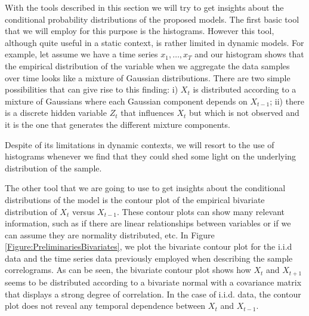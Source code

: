 With the tools described in this section we will try to get insights about the conditional probability distributions of the proposed models. The first basic tool that we will employ for this purpose is the histograms. However this tool, although quite useful in a static context, is rather limited in dynamic models. For example, let assume we have a time series $x_1,\ldots, x_T$ and our histogram shows that the empirical distribution of the variable when we aggregate the data samples over time looks like a mixture of Gaussian distributions. 
There are two simple possibilities that can give rise to this finding: 
i) $X_t$ is distributed according to a mixture of Gaussians where each Gaussian component depends on $X_{t-1}$; ii) there is a discrete hidden variable $Z_t$ that influences $X_{t}$ but which is not observed and it is the one that generates the different mixture components. 

Despite of its limitations in dynamic contexts, we will resort to the use of histograms whenever we find that they could shed some light on the underlying distribution of the sample.

The other tool that we are going to use to get insights about the conditional distributions of the model is the contour plot of the empirical bivariate distribution of $X_t$ versus $X_{t-1}$. These contour plots can show many relevant information, such as if there are linear relationships between variables or if we can assume they are normality distributed, etc. In Figure \ref{Figure:PreliminariesBivariates}, we plot the bivariate contour plot for the i.i.d data and the time series data previously employed when describing the sample correlograms. As can be seen, the bivariate contour plot shows how $X_t$ and $X_{t+1}$ seems to be distributed according to a bivariate normal with a covariance matrix that displays a strong degree of correlation. In the case of i.i.d. data, the contour plot does not reveal  any temporal dependence between $X_t$ and $X_{t-1}$. 

